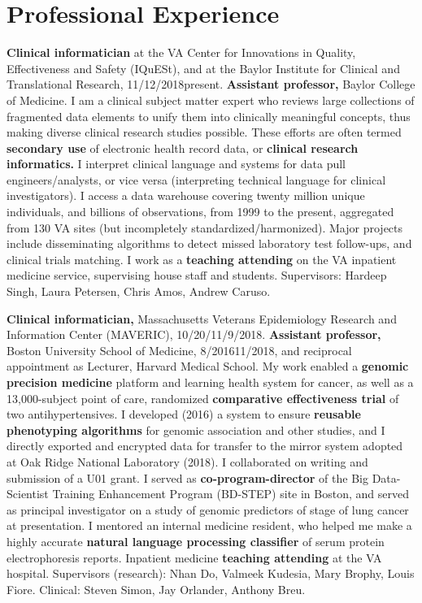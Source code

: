 \documentclass[10pt]{article}
\begin{document}
\section*{Professional Experience} %

\textbf{Clinical informatician} at the VA Center for Innovations in
Quality, Effectiveness and Safety (IQuESt), and at the Baylor
Institute for Clinical and Translational Research,
11/12/2018\ndash{}present. \textbf{Assistant professor,} Baylor
College of Medicine. I am a clinical subject matter expert who reviews
large collections of fragmented data elements to unify them into
clinically meaningful concepts, thus making diverse clinical research
studies possible.  These efforts are often termed \textbf{secondary
  use} of electronic health record data, or \textbf{clinical research
  informatics.} I interpret clinical language and systems for data
pull engineers/analysts, or vice versa (interpreting technical
language for clinical investigators). I access a data warehouse
covering twenty million unique individuals, and billions of
observations, from 1999 to the present, aggregated from 130 VA sites
(but incompletely standardized/harmonized). Major projects include
disseminating algorithms to detect missed laboratory test follow-ups,
and clinical trials matching. I work as a \textbf{teaching
  attending} on the VA inpatient medicine service, supervising house
staff and students. Supervisors: Hardeep Singh, Laura
Petersen, Chris Amos, Andrew Caruso.

\textbf{Clinical informatician,} Massachusetts Veterans Epidemiology
Research and Information Center (MAVERIC),
10/20/\ndash{}11/9/2018. \textbf{Assistant
  professor,} Boston University School of Medicine,
8/2016\ndash{}11/2018, and reciprocal appointment as Lecturer, Harvard
Medical School. My work enabled a \textbf{genomic precision medicine}
platform and learning health system for cancer, as well as
a 13,000-subject point of care, randomized \textbf{comparative
  effectiveness trial} of two antihypertensives. I developed (2016) a system
to ensure \textbf{reusable phenotyping algorithms} for genomic
association and other studies, and I directly exported and encrypted
data for transfer to the mirror system adopted at Oak Ridge National
Laboratory (2018). I collaborated on writing and submission of a
U01 grant. I served as \textbf{co-program-director} of the Big
Data-Scientist Training Enhancement Program (BD-STEP) site in Boston,
and served as principal investigator on a study of genomic predictors
of stage of lung cancer at presentation. I mentored an internal
medicine resident, who helped me make a highly accurate
\textbf{natural language processing classifier} of serum protein
electrophoresis reports. Inpatient medicine \textbf{teaching
  attending} at the VA hospital. Supervisors (research): Nhan Do,
Valmeek Kudesia, Mary Brophy, Louis Fiore. Clinical: Steven Simon, Jay
Orlander, Anthony Breu.
\end{document}
